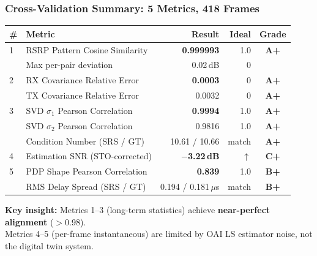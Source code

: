 \documentclass[aspectratio=169, 11pt]{beamer}
\begin{document}
\begin{frame}
\frametitle{Cross-Validation Summary: 5 Metrics, 418 Frames}

\begin{center}
\renewcommand{\arraystretch}{1.25}
\small
\begin{tabular}{@{} l l r r c @{}}
\toprule
\textbf{\#} & \textbf{Metric} & \textbf{Result} & \textbf{Ideal} & \textbf{Grade} \\
\midrule
\rowcolor{lightbg}
1 & RSRP Pattern Cosine Similarity & \textbf{0.999993} & 1.0 & \color{good}\textbf{A+} \\
  & \quad Max per-pair deviation & 0.02\,dB & 0 & \\
\rowcolor{lightbg}
2 & RX Covariance Relative Error & \textbf{0.0003} & 0 & \color{good}\textbf{A+} \\
  & TX Covariance Relative Error & 0.0032 & 0 & \color{good}\textbf{A+} \\
\rowcolor{lightbg}
3 & SVD $\sigma_1$ Pearson Correlation & \textbf{0.9994} & 1.0 & \color{good}\textbf{A+} \\
  & SVD $\sigma_2$ Pearson Correlation & 0.9816 & 1.0 & \color{good}\textbf{A+} \\
  & Condition Number (SRS / GT) & 10.61 / 10.66 & match & \color{good}\textbf{A+} \\
\rowcolor{lightbg}
4 & Estimation SNR (STO-corrected) & \textbf{$-$3.22\,dB} & $\uparrow$ & \color{warn}\textbf{C+} \\
\rowcolor{lightbg}
5 & PDP Shape Pearson Correlation & \textbf{0.839} & 1.0 & \color{good}\textbf{B+} \\
  & RMS Delay Spread (SRS / GT) & 0.194 / 0.181\,$\mu$s & match & \color{good}\textbf{B+} \\
\bottomrule
\end{tabular}
\end{center}

\vspace{3mm}
\begin{center}
\footnotesize
\colorbox{lightbg}{\parbox{0.85\textwidth}{\centering
\textbf{Key insight:} Metrics 1--3 (long-term statistics) achieve \textbf{near-perfect alignment} ($>$0.98).\\
Metrics 4--5 (per-frame instantaneous) are limited by OAI LS estimator noise, not the digital twin system.
}}
\end{center}
\end{frame}
\end{document}
